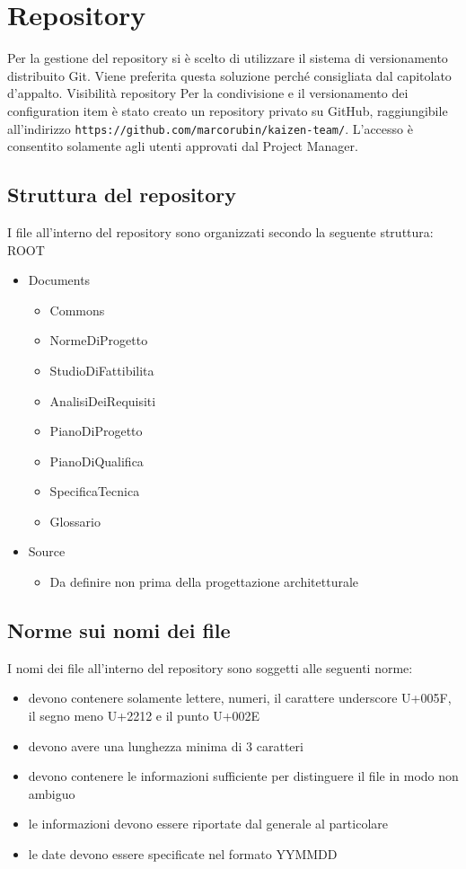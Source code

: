 \section{Repository}


Per la gestione del repository si è scelto di utilizzare il sistema di versionamento distribuito Git. Viene preferita questa soluzione perché consigliata dal capitolato d’appalto.
Visibilità repository
Per la condivisione e il versionamento dei configuration item è stato creato un repository privato su GitHub,  raggiungibile all’indirizzo \texttt{https://github.com/marcorubin/kaizen-team/}. L’accesso è consentito solamente agli utenti approvati dal Project Manager.
\subsection{Struttura del repository}
I file all’interno del repository sono organizzati secondo la seguente struttura: \\
ROOT
\begin{itemize}
	\item Documents
		\begin{itemize}
			\item Commons
			\item NormeDiProgetto
			\item StudioDiFattibilita
			\item AnalisiDeiRequisiti
			\item PianoDiProgetto
			\item PianoDiQualifica
			\item SpecificaTecnica
			\item Glossario
		\end{itemize}
	\item Source
		\begin{itemize}
			\item Da definire non prima della progettazione architetturale
		\end{itemize}
\end{itemize}

	
\subsection{Norme sui nomi dei file}
I nomi dei file all’interno del repository sono soggetti alle seguenti norme:
\begin{itemize}
	\item devono contenere solamente lettere, numeri, il carattere underscore U+005F, il segno meno U+2212 e il punto U+002E
	\item devono avere una lunghezza minima di 3 caratteri
	\item devono contenere le informazioni sufficiente per distinguere il file in modo non ambiguo
	\item le informazioni devono essere riportate dal generale al particolare
	\item le date devono essere specificate nel formato YYMMDD
\end{itemize}

